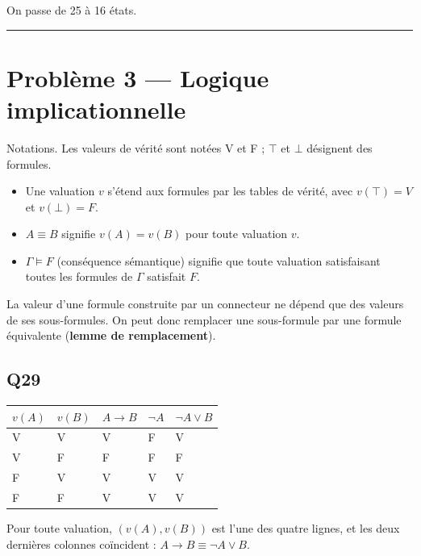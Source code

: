 \documentclass[11pt,a4paper]{article}
\providecommand{\tightlist}{\setlength{\itemsep}{0pt}\setlength{\parskip}{0pt}}
\begin{document}
On passe de 25 à 16 états.

\begin{center}\rule{0.5\linewidth}{0.5pt}\end{center}

\hypertarget{probluxe8me-3-logique-implicationnelle}{%
\section{Problème 3 --- Logique implicationnelle}\label{probluxe8me-3-logique-implicationnelle}}

Notations. Les valeurs de vérité sont notées V et F ; \(\top\) et \(\bot\) désignent des formules.

\begin{itemize}
\tightlist
\item
  Une valuation \(v\) s'étend aux formules par les tables de vérité, avec \(v(\top) = V\) et \(v(\bot) = F\).
\item
  \(A \equiv B\) signifie \(v(A) = v(B)\) pour toute valuation \(v\).
\item
  \(\Gamma \models F\) (conséquence sémantique) signifie que toute valuation satisfaisant toutes les formules de \(\Gamma\) satisfait \(F\).
\end{itemize}

La valeur d'une formule construite par un connecteur ne dépend que des valeurs de ses sous-formules. On peut donc remplacer une sous-formule par une formule équivalente (\textbf{lemme de remplacement}).

\hypertarget{q29}{%
\subsection{Q29}\label{q29}}

\begin{longtable}[]{@{}lllll@{}}
\toprule\noalign{}
\(v(A)\) & \(v(B)\) & \(A \to B\) & \(\neg A\) & \(\neg A \vee B\) \\
\midrule\noalign{}
\endhead
\bottomrule\noalign{}
\endlastfoot
V & V & V & F & V \\
V & F & F & F & F \\
F & V & V & V & V \\
F & F & V & V & V \\
\end{longtable}

Pour toute valuation, \((v(A), v(B))\) est l'une des quatre lignes, et les deux dernières colonnes coïncident : \(\boxed{A \to B \equiv \neg A \vee B}\).
\end{document}
